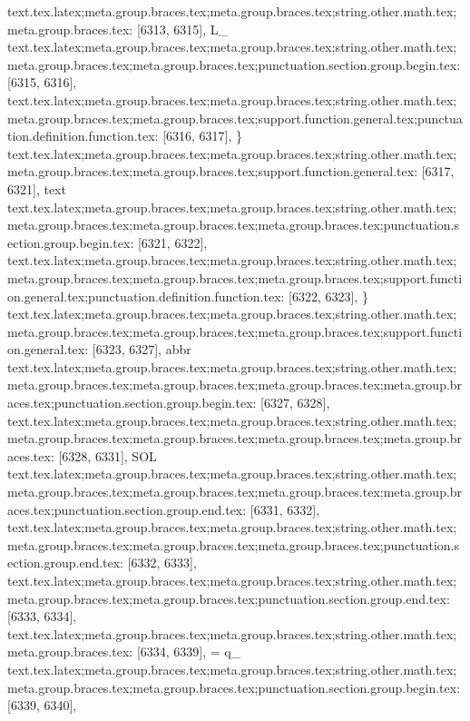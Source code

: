{{{{{{{{{{{{{{{{{{{{{{{{{{{{{{{{{{{{{{{{{{{{{{{{{{{{{{{{{{{{{{{{{{{{{{{{{{{{{{{{{{{{{{{{{{{{{{{{{{{{{{{{{{{{{{{{{{{{{{{{{{{{{{{{{{{{{{{{{{{{{{{{{{{{{{{{{{{{{{{{{{{{{{{{{{{{text.tex.latex;meta.group.braces.tex;meta.group.braces.tex;string.other.math.tex;meta.group.braces.tex: [6313, 6315], {L_}
text.tex.latex;meta.group.braces.tex;meta.group.braces.tex;string.other.math.tex;meta.group.braces.tex;meta.group.braces.tex;punctuation.section.group.begin.tex: [6315, 6316], {{}
text.tex.latex;meta.group.braces.tex;meta.group.braces.tex;string.other.math.tex;meta.group.braces.tex;meta.group.braces.tex;support.function.general.tex;punctuation.definition.function.tex: [6316, 6317], {\}
text.tex.latex;meta.group.braces.tex;meta.group.braces.tex;string.other.math.tex;meta.group.braces.tex;meta.group.braces.tex;support.function.general.tex: [6317, 6321], {text}
text.tex.latex;meta.group.braces.tex;meta.group.braces.tex;string.other.math.tex;meta.group.braces.tex;meta.group.braces.tex;meta.group.braces.tex;punctuation.section.group.begin.tex: [6321, 6322], {{}
text.tex.latex;meta.group.braces.tex;meta.group.braces.tex;string.other.math.tex;meta.group.braces.tex;meta.group.braces.tex;meta.group.braces.tex;support.function.general.tex;punctuation.definition.function.tex: [6322, 6323], {\}
text.tex.latex;meta.group.braces.tex;meta.group.braces.tex;string.other.math.tex;meta.group.braces.tex;meta.group.braces.tex;meta.group.braces.tex;support.function.general.tex: [6323, 6327], {abbr}
text.tex.latex;meta.group.braces.tex;meta.group.braces.tex;string.other.math.tex;meta.group.braces.tex;meta.group.braces.tex;meta.group.braces.tex;meta.group.braces.tex;punctuation.section.group.begin.tex: [6327, 6328], {{}
text.tex.latex;meta.group.braces.tex;meta.group.braces.tex;string.other.math.tex;meta.group.braces.tex;meta.group.braces.tex;meta.group.braces.tex;meta.group.braces.tex: [6328, 6331], {SOL}
text.tex.latex;meta.group.braces.tex;meta.group.braces.tex;string.other.math.tex;meta.group.braces.tex;meta.group.braces.tex;meta.group.braces.tex;meta.group.braces.tex;punctuation.section.group.end.tex: [6331, 6332], {}}
text.tex.latex;meta.group.braces.tex;meta.group.braces.tex;string.other.math.tex;meta.group.braces.tex;meta.group.braces.tex;meta.group.braces.tex;punctuation.section.group.end.tex: [6332, 6333], {}}
text.tex.latex;meta.group.braces.tex;meta.group.braces.tex;string.other.math.tex;meta.group.braces.tex;meta.group.braces.tex;punctuation.section.group.end.tex: [6333, 6334], {}}
text.tex.latex;meta.group.braces.tex;meta.group.braces.tex;string.other.math.tex;meta.group.braces.tex: [6334, 6339], { = q_}
text.tex.latex;meta.group.braces.tex;meta.group.braces.tex;string.other.math.tex;meta.group.braces.tex;meta.group.braces.tex;punctuation.section.group.begin.tex: [6339, 6340], {{}
}}}}}}}}}}}}}}}}}}}}}}}}}}}}}}}}}}}}}}}}}}}}}}}}}}}}}}}}}}}}}}}}}}}}}}}}}}}}}}}}}}}}}}}}}}}}}}}}}}}}}}}}}}}}}}}}}}}}}}}}}}}}}}}}}}}}}}}}}}}}}}}}}}}}}}}}}}}}}}}}}}}}}}}}}}}}}}}
